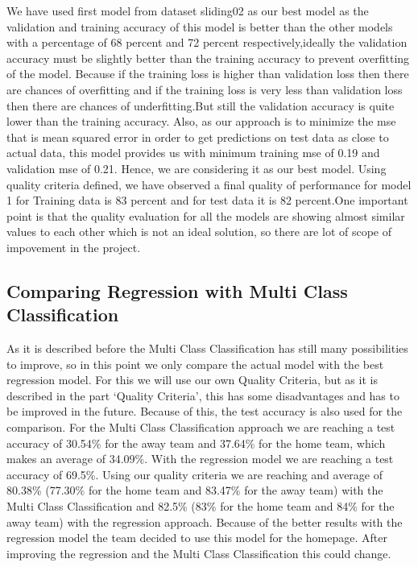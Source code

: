 We have used first model from dataset sliding02 as our best model as the  validation and training accuracy of this model is better than the other models with a percentage of 68 percent and 72 percent respectively,ideally the validation accuracy must be slightly better than the training accuracy to prevent overfitting of the model. Because if the training loss is higher than validation loss then there are chances of overfitting and if the training loss is very less than validation loss then there are chances of underfitting.But still the validation accuracy is quite lower than the training accuracy.\newline
Also, as our approach is to minimize the mse that is mean squared error in order to get predictions on test data as close to actual data, this model provides us with minimum training mse of 0.19 and validation mse of 0.21. Hence, we are considering it as our best model.\newline
Using quality criteria defined, we have observed a final quality of performance for model 1 for Training data is 83 percent and for test data it is 82 percent.One important point is that the quality evaluation for all the models are showing almost similar values to each other which is not an ideal solution, so there are lot of scope of impovement in the project.\newline

\subsection{Comparing Regression with Multi Class Classification}
As it is described before the Multi Class Classification has still many possibilities to improve, so in this point we only compare the actual model with the best regression model. For this we will use our own Quality Criteria, but as it is described in the part `Quality Criteria', this has some disadvantages and has to be improved in the future. Because of this, the test accuracy is also used for the comparison. For the Multi Class Classification approach we are reaching a test accuracy of 30.54\% for the away team and 37.64\% for the home team, which makes an average of 34.09\%. With the regression model we are reaching a test accuracy of 69.5\%. Using our quality criteria we are reaching and average of  80.38\% (77.30\% for the home team and 83.47\% for the away team) with the Multi Class Classification and 82.5\% (83\% for the home team and 84\% for the away team) with the regression approach. Because of the better results with the regression model the team decided to use this model for the homepage. After improving the regression and the Multi Class Classification this could change. 